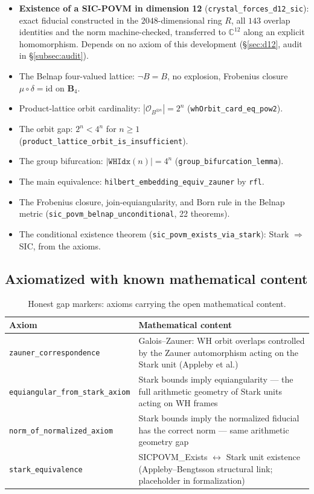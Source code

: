 \documentclass[12pt,a4paper]{article}
\newcommand{\BFour}{\mathbf{B}_4}
\begin{document}
\begin{itemize}
  \item \textbf{Existence of a SIC-POVM in dimension 12}
    (\texttt{crystal\_forces\_d12\_sic}): exact fiducial constructed in the
    $2048$-dimensional ring $R$, all $143$ overlap identities and the norm
    machine-checked, transferred to $\mathbb{C}^{12}$ along an explicit
    homomorphism.  Depends on no axiom of this development
    (\S\ref{sec:d12}, audit in \S\ref{subsec:audit}).
  \item The Belnap four-valued lattice: $\neg B = B$, no explosion, Frobenius
    closure $\mu \circ \delta = \mathrm{id}$ on $\BFour$.
  \item Product-lattice orbit cardinality: $|\mathcal{O}_{B^{\otimes n}}| = 2^n$
    (\texttt{whOrbit\_card\_eq\_pow2}).
  \item The orbit gap: $2^n < 4^n$ for $n \geq 1$
    (\texttt{product\_lattice\_orbit\_is\_insufficient}).
  \item The group bifurcation: $|\texttt{WHIdx}(n)| = 4^n$
    (\texttt{group\_bifurcation\_lemma}).
  \item The main equivalence: \texttt{hilbert\_embedding\_equiv\_zauner} by \texttt{rfl}.
  \item The Frobenius closure, join-equiangularity, and Born rule in the
    Belnap metric (\texttt{sic\_povm\_belnap\_unconditional}, 22 theorems).
  \item The conditional existence theorem (\texttt{sic\_povm\_exists\_via\_stark}):
    Stark $\Rightarrow$ SIC, from the axioms.
\end{itemize}

\subsection{Axiomatized with known mathematical content}

\begin{table}[h]
\centering
\begin{tabular}{@{}lp{9cm}@{}}
\toprule
\textbf{Axiom} & \textbf{Mathematical content} \\
\midrule
\texttt{zauner\_correspondence} & Galois--Zauner: WH orbit overlaps controlled
  by the Zauner automorphism acting on the Stark unit (Appleby et al.) \\
\texttt{equiangular\_from\_stark\_axiom} & Stark bounds imply equiangularity ---
  the full arithmetic geometry of Stark units acting on WH frames \\
\texttt{norm\_of\_normalized\_axiom} & Stark bounds imply the normalized fiducial
  has the correct norm --- same arithmetic geometry gap \\
\texttt{stark\_equivalence} & SICPOVM\_Exists $\leftrightarrow$ Stark unit existence
  (Appleby--Bengtsson structural link; placeholder in formalization) \\
\bottomrule
\end{tabular}
\caption{Honest gap markers: axioms carrying the open mathematical content.}
\label{tab:axioms}
\end{table}
\end{document}
